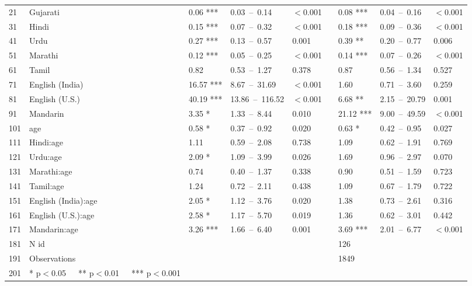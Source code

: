 \begin{table}[ht]
\begin{tabular}{}
  21 & Gujarati & 0.06 *** & 0.03 – 0.14 & $<$0.001 &  & 0.08 *** & 0.04 – 0.16 & $<$0.001 \\ 
  31 & Hindi & 0.15 *** & 0.07 – 0.32 & $<$0.001 &  & 0.18 *** & 0.09 – 0.36 & $<$0.001 \\ 
  41 & Urdu & 0.27 *** & 0.13 – 0.57 & 0.001 &  & 0.39 ** & 0.20 – 0.77 & 0.006 \\ 
  51 & Marathi & 0.12 *** & 0.05 – 0.25 & $<$0.001 &  & 0.14 *** & 0.07 – 0.26 & $<$0.001 \\ 
  61 & Tamil & 0.82 & 0.53 – 1.27 & 0.378 &  & 0.87 & 0.56 – 1.34 & 0.527 \\ 
  71 & English (India) & 16.57 *** & 8.67 – 31.69 & $<$0.001 &  & 1.60 & 0.71 – 3.60 & 0.259 \\ 
  81 & English (U.S.) & 40.19 *** & 13.86 – 116.52 & $<$0.001 &  & 6.68 ** & 2.15 – 20.79 & 0.001 \\ 
  91 & Mandarin & 3.35 * & 1.33 – 8.44 & 0.010 &  & 21.12 *** & 9.00 – 49.59 & $<$0.001 \\ 
  101 & age & 0.58 * & 0.37 – 0.92 & 0.020 &  & 0.63 * & 0.42 – 0.95 & 0.027 \\ 
  111 & Hindi:age & 1.11 & 0.59 – 2.08 & 0.738 &  & 1.09 & 0.62 – 1.91 & 0.769 \\ 
  121 & Urdu:age & 2.09 * & 1.09 – 3.99 & 0.026 &  & 1.69 & 0.96 – 2.97 & 0.070 \\ 
  131 & Marathi:age & 0.74 & 0.40 – 1.37 & 0.338 &  & 0.90 & 0.51 – 1.59 & 0.723 \\ 
  141 & Tamil:age & 1.24 & 0.72 – 2.11 & 0.438 &  & 1.09 & 0.67 – 1.79 & 0.722 \\ 
  151 & English (India):age & 2.05 * & 1.12 – 3.76 & 0.020 &  & 1.38 & 0.73 – 2.61 & 0.316 \\ 
  161 & English (U.S.):age & 2.58 * & 1.17 – 5.70 & 0.019 &  & 1.36 & 0.62 – 3.01 & 0.442 \\ 
  171 & Mandarin:age & 3.26 *** & 1.66 – 6.40 & 0.001 &  & 3.69 *** & 2.01 – 6.77 & $<$0.001 \\ 
  181 & N id &  &  &  &  & 126 &  &  \\ 
  191 & Observations &  &  &  &  & 1849 &  &  \\ 
  201 & * p$<$0.05   ** p$<$0.01   *** p$<$0.001 &  &  &  &  &  &  &  \\ 
   \hline
\end{tabular}
\end{table}
